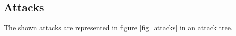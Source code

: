 \subsection{Attacks}




The shown attacks are represented in figure \ref{fig_attacks} in an attack tree.
